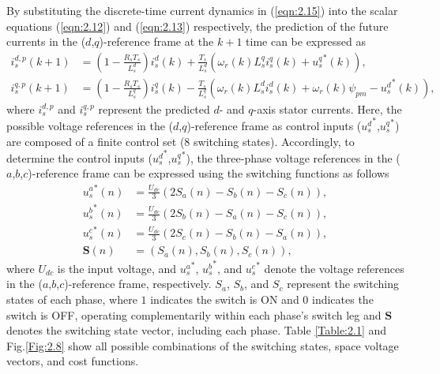 By substituting the discrete-time current dynamics in (\ref{eqn:2.15}) into the scalar equations (\ref{eqn:2.12}) and (\ref{eqn:2.13}) respectively, the prediction of the future currents in the ($d$,$q$)-reference frame at the \( k+1 \) time can be expressed as 
\begin{align}\label{eqn:2.16}
i^{d,p}_s(k + 1) &= \left( 1 - \frac{R_s T_s}{L^d_s} \right) i^{d}_s(k) + \frac{T_s}{L^d_s}\left( \omega_r(k) L^q_s i^{q}_s(k) + {u_{s}^q}^*(k)  \right),  \\\label{eqn:2.17} 
i^{q,p}_s(k + 1) &= \left( 1 - \frac{R_s T_s}{L^q_s} \right) i^{q}_s(k) - \frac{T_s}{L^q_s}\left( \omega_r(k) L^d_s i^d_s(k) + \omega_r(k) \psi_{pm}  - {u_{s}^d}^*(k) \right),
\end{align}
where $i^{d,p}_s$ and $i^{q,p}_s$ represent the predicted $d$- and $q$-axis stator currents. Here, the possible voltage references in the ($d$,$q$)-reference frame as control inputs (${u_{s}^d}^*$,${u_{s}^q}^*$) are composed of a finite control set (8 switching states). Accordingly, to determine the control inputs (${u_{s}^d}^*$,${u_{s}^q}^*$), the three-phase voltage references in the ($a$,$b$,$c$)-reference frame can be expressed using the switching functions as follows
\begin{align}\label{eqn:2.18}
{u_{s}^a}^*(n) &= \frac{U_{dc}}{3}\left(2S_a(n) - S_b(n) - S_c(n)\right), \\\label{eqn:2.19}
{u_{s}^b}^*(n) &= \frac{U_{dc}}{3}\left(2S_b(n) - S_a(n) - S_c(n)\right), \\\label{eqn:2.20}
{u_{s}^c}^*(n) &= \frac{U_{dc}}{3}\left(2S_c(n) - S_b(n) - S_a(n)\right), \\
\bm{S}(n) &= \left(S_a(n),S_b(n),S_c(n)  \right), 
\end{align}
where \( U_{dc} \) is the input voltage, and \( {u_{s}^a}^* \), \( {u_{s}^b}^* \), and \( {u_{s}^c}^* \) denote the voltage references in the ($a$,$b$,$c$)-reference frame, respectively. \( S_a \), \( S_b \), and \( S_c \) represent the switching states of each phase, where $1$ indicates the switch is ON and $0$ indicates the switch is OFF, operating complementarily within each phase's switch leg and \(\bm{S}\) denotes the switching state vector, including each phase. Table \ref{Table:2.1} and Fig.\ref{Fig:2.8} show all possible combinations of the switching states, space voltage vectors, and cost functions. 

